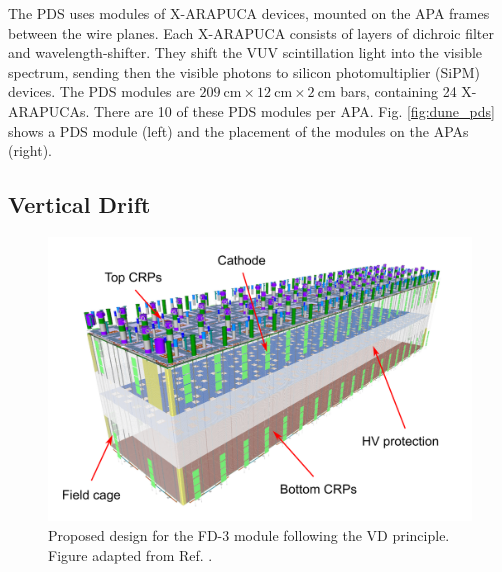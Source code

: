The PDS uses modules of X-ARAPUCA devices, mounted on the APA frames between the wire planes. Each X-ARAPUCA consists of layers of dichroic filter and wavelength-shifter. They shift the VUV scintillation light into the visible spectrum, sending then the visible photons to silicon photomultiplier (SiPM) devices. The PDS modules are $209~\mathrm{cm}\times12~\mathrm{cm}\times2~\mathrm{cm}$ bars, containing 24 X-ARAPUCAs. There are 10 of these PDS modules per APA. Fig. \ref{fig:dune_pds} shows a PDS module (left) and the placement of the modules on the APAs (right).

\subsection{Vertical Drift}

\begin{figure}[t]
	\centering
	\includegraphics[width=0.70\linewidth]{Images/DUNE/FD/dune_vd}
	\caption[Proposed design for the FD-3 module following the VD principle.]{Proposed design for the FD-3 module following the VD principle. Figure adapted from Ref. \cite{DUNEVDTDR}.}
	\label{fig:dune_vd}
\end{figure}

